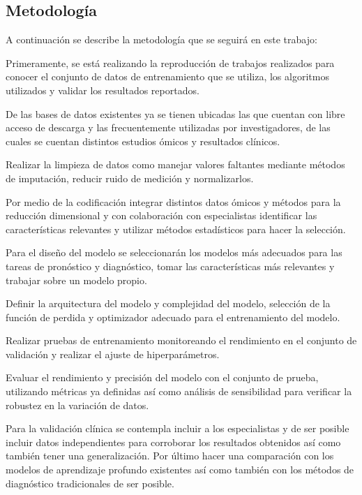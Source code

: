 \subsection{Metodología}

A continuación se describe la metodología que se seguirá en este trabajo:

Primeramente, se está realizando la reproducción de trabajos realizados para conocer el conjunto de datos de entrenamiento que se utiliza, los algoritmos utilizados y validar los resultados reportados.

De las bases de datos existentes ya se tienen ubicadas las que cuentan con libre acceso de descarga y las frecuentemente utilizadas por investigadores, de las cuales se cuentan distintos estudios ómicos y resultados clínicos.

Realizar la limpieza de datos como manejar valores faltantes mediante métodos de imputación, reducir ruido de medición y normalizarlos.

Por medio de la codificación integrar distintos datos ómicos y métodos para la reducción dimensional y con colaboración con especialistas identificar las características relevantes y utilizar métodos estadísticos para hacer la selección.

Para el diseño del modelo se seleccionarán los modelos más adecuados para las tareas de pronóstico y diagnóstico, tomar las características más relevantes y trabajar sobre un modelo propio.

Definir la arquitectura del modelo y complejidad del modelo, selección de la función de perdida y optimizador adecuado para el entrenamiento del modelo.

Realizar pruebas de entrenamiento monitoreando el rendimiento en el conjunto de validación y realizar el ajuste de hiperparámetros.

Evaluar el rendimiento y precisión del modelo con el conjunto de prueba, utilizando métricas ya definidas así como análisis de sensibilidad para verificar la robustez en la variación de datos.

Para la validación clínica se contempla incluir a los especialistas y de ser posible incluir datos independientes para corroborar los resultados obtenidos así como también tener una generalización. Por último hacer una comparación con los modelos de aprendizaje profundo existentes así como también con los métodos de diagnóstico tradicionales de ser posible.










